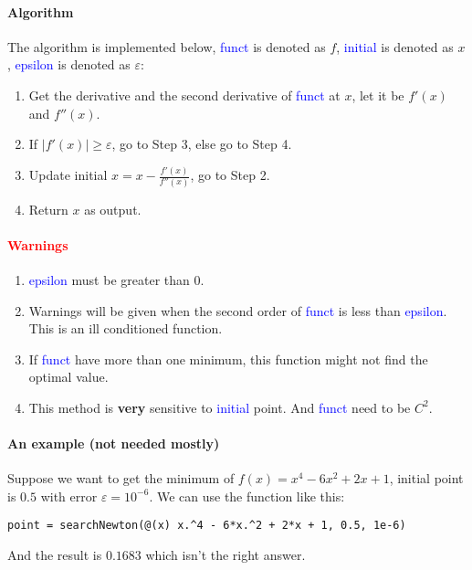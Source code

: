 \documentclass{article}
\begin{document}
\paragraph{Algorithm}
The algorithm is implemented below, \textcolor{blue}{funct} is denoted as $f$, \textcolor{blue}{initial} is denoted as $x$, \textcolor{blue}{epsilon} is denoted as $\varepsilon$:
\begin{enumerate}
    \item Get the derivative and the second derivative of \textcolor{blue}{funct} at $x$, let it be $f'(x)$ and $f''(x)$.
    \item If $|f'(x)| \geqslant \varepsilon$, go to Step 3, else go to Step 4.
    \item Update initial $x = x - \frac{f'(x)}{f''(x)}$, go to Step 2.
    \item Return $x$ as output.
\end{enumerate}

\paragraph{\textcolor{red}{Warnings}}
\begin{enumerate}
    \item \textcolor{blue}{epsilon} must be greater than $0$. 
    \item Warnings will be given when the second order of \textcolor{blue}{funct} is less than \textcolor{blue}{epsilon}. This is an ill conditioned function.
    \item If \textcolor{blue}{funct} have more than one minimum, this function might not find the optimal value.
    \item This method is \textbf{very} sensitive to \textcolor{blue}{initial} point. And \textcolor{blue}{funct} need to be $C^2$.
\end{enumerate}

\paragraph{An example (not needed mostly)}
Suppose we want to get the minimum of $f(x) = x^4 - 6x^2 + 2x + 1$, initial point is $0.5$ with error $\varepsilon = 10^{-6}$. We can use the function like this:
\begin{verbatim}
point = searchNewton(@(x) x.^4 - 6*x.^2 + 2*x + 1, 0.5, 1e-6)
\end{verbatim}

And the result is $0.1683$ which isn't the right answer.
\end{document}
